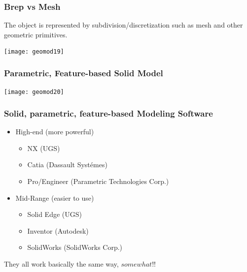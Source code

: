 \begin{frame}[fragile]\frametitle{Brep vs Mesh  }

The object is represented by subdivision/discretization such as mesh and other geometric primitives.


			\begin{center}
	\texttt{[image: geomod19]}
			\end{center}
\end{frame}

\begin{frame}[fragile]\frametitle{Parametric, Feature-based Solid Model}
			\begin{center}
	\texttt{[image: geomod20]}
			\end{center}
\end{frame}

\begin{frame}[fragile]\frametitle{Solid, parametric, feature-based Modeling Software}

\begin{itemize}
\item High-end (more powerful)
\begin{itemize}

\item NX (UGS)
\item Catia (Dassault Systémes)
\item Pro/Engineer (Parametric Technologies Corp.)
\end{itemize}

\item Mid-Range (easier to use)
\begin{itemize}

\item Solid Edge (UGS)
\item Inventor (Autodesk)
\item SolidWorks (SolidWorks Corp.)
\end{itemize}
\end{itemize}

They all work basically the same way, $somewhat$!!

\end{frame}